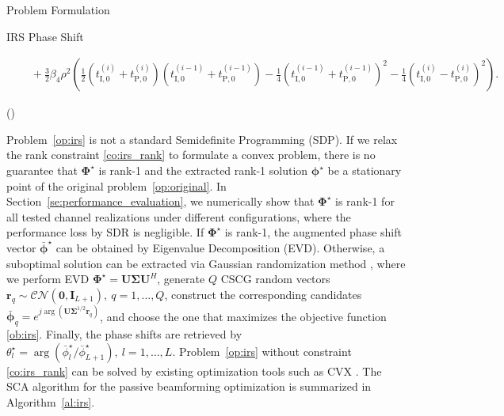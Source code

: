 \documentclass[journal]{IEEEtran}
\begin{document}
\begin{section}{Problem Formulation}
\begin{subsection}{IRS Phase Shift}
\begin{figure*}[!b]
\begin{align}
					& \quad + \frac{3}{2}{\beta_4}{\rho^2} \left(\frac{1}{2}(t_{\mathrm{I},0}^{(i)} + t_{\mathrm{P},0}^{(i)})(t_{\mathrm{I},0}^{(i-1)} + t_{\mathrm{P},0}^{(i-1)}) - \frac{1}{4}(t_{\mathrm{I},0}^{(i-1)} + t_{\mathrm{P},0}^{(i-1)})^2 - \frac{1}{4}(t_{\mathrm{I},0}^{(i)} - t_{\mathrm{P},0}^{(i)})^2\right).\label{eq:z_irs_approx}
				\end{align}
			\end{figure*}
			\begin{maxi!}
				{\boldsymbol{\Phi}}{(\boldsymbol{\Phi})}{\label{op:irs}}{\label{ob:irs}}
				\label{co:irs_rate}
				\label{co:irs_modulus}
			\end{maxi!}
			Problem~\eqref{op:irs} is not a standard Semidefinite Programming (SDP). If we relax the rank constraint \eqref{co:irs_rank} to formulate a convex problem, there is no guarantee that $\boldsymbol{\Phi}^{\star}$ is rank-\num{1} and the extracted rank-\num{1} solution $\boldsymbol{\phi}^{\star}$ be a stationary point of the original problem~\eqref{op:original}. In Section~\ref{se:performance_evaluation}, we numerically show that $\boldsymbol{\Phi}^{\star}$ is rank-\num{1} for all tested channel realizations under different configurations, where the performance loss by SDR is negligible. If $\boldsymbol{\Phi}^{\star}$ is rank-\num{1}, the augmented phase shift vector $\bar{\boldsymbol{\phi}}^\star$ can be obtained by Eigenvalue Decomposition (EVD). Otherwise, a suboptimal solution can be extracted via Gaussian randomization method \cite{Huang2010}, where we perform EVD $\boldsymbol{\Phi}^{\star}=\boldsymbol{U}\boldsymbol{\Sigma}\boldsymbol{U}^H$, generate $Q$ CSCG random vectors $\boldsymbol{r}_q \sim \mathcal{CN}(\boldsymbol{0},\boldsymbol{I}_{L+1}),\ q=1,\dots,Q$, construct the corresponding candidates $\bar{\boldsymbol{\phi}}_q=e^{j\arg\left(\boldsymbol{U}\boldsymbol{\Sigma}^{1/2}\boldsymbol{r}_q\right)}$, and choose the one that maximizes the objective function \eqref{ob:irs}. Finally, the phase shifts are retrieved by $\theta_l^{\star}=\arg(\bar{\phi}_l^\star/\bar{\phi}_{L+1}^\star), \ l=1,\dots,L$. Problem~\eqref{op:irs} without constraint \eqref{co:irs_rank} can be solved by existing optimization tools such as CVX \cite{Grant2013}. The SCA algorithm for the passive beamforming optimization is summarized in Algorithm~\ref{al:irs}.
			\begin{algorithm}[!t]

\end{algorithm}
\end{subsection}
\end{section}
\end{document}
